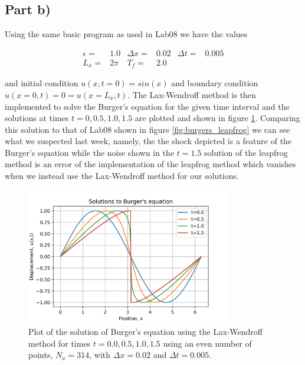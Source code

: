 \documentclass{article}
\begin{document}
\subsection{Part b)}

Using the same basic program as used in Lab08 we have the values 

\begin{align}
	\epsilon =& 1.0 & \Delta x =& 0.02 & \Delta t =& 0.005 \\
	L_x =& 2\pi & T_f =& 2.0 & 
\end{align}

and initial condition $u(x,t=0)=sin(x)$ and boundary condition $u(x=0,t)=0=u(x=L_x,t)$. The Lax-Wendroff method is then implemented to solve the Burger's equation for the given time interval and the solutions at times $t=0, 0.5, 1.0, 1.5$ are plotted and shown in figure \ref{fig:burgers_lax}. Comparing this solution to that of Lab08 shown in figure \ref{fig:burgers_leapfrog} we can see what we suspected last week, namely, the the shock depicted is a feature of the Burger's equation while the noise shown in the $t=1.5$ solution of the leapfrog method is an error of the implementation of the leapfrog method which vanishes when we instead use the Lax-Wendroff method for our solutions.

\begin{figure}[H]
	\centering
	\includegraphics[width=0.8\textwidth]{../images/burgers.png}
	\caption{Plot of the solution of Burger's equation using the Lax-Wendroff method for times $t=0.0,0.5,1.0,1.5$ using an even number of points, $N_x=314$, with $\Delta x=0.02$ and $\Delta t=0.005$.}
	\label{fig:burgers_lax}
\end{figure}
\end{document}
